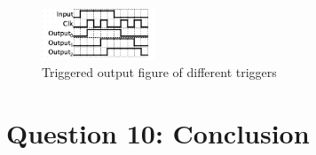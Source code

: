 \documentclass[conference]{IEEEtran}
\begin{document}
\begin{figure}[h!]
    \centering
    \includegraphics[width=0.3\textwidth]{assets/trigger-output.png}
    \caption{Triggered output figure of different triggers}
    \label{fig:trigger-output}
\end{figure}


\section{Question 10: Conclusion}
\end{document}
